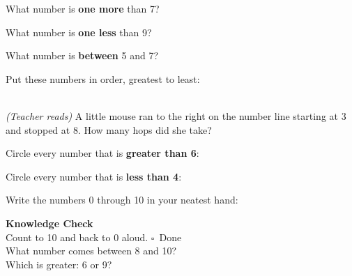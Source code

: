 \documentclass[12pt,letterpaper]{article}
\begin{document}
\vspace{12pt}
\prob What number is \textbf{one more} than 7? \quad\ansblank

\vspace{10pt}
\prob What number is \textbf{one less} than 9? \quad\ansblank

\vspace{10pt}
\prob What number is \textbf{between} 5 and 7? \quad\ansblank

\vspace{10pt}
\prob Put these numbers in order, greatest to least:\\[6pt]
\hspace{2cm}{\Large 4 \quad 9 \quad 2 \quad 7 \quad 6}\\[6pt]
\hspace{2cm}\ansblank\quad\ansblank\quad\ansblank\quad\ansblank\quad\ansblank

\vspace{10pt}
\prob \textit{(Teacher reads)} A little mouse ran to the right on the number line
starting at 3 and stopped at 8.
How many hops did she take? \quad\ansblank

\vspace{10pt}
\prob Circle every number that is \textbf{greater than 6}:\\[6pt]
\hspace{2cm}{\Large 0 \quad 5 \quad 7 \quad 10 \quad 3 \quad 9 \quad 6 \quad 8}

\vspace{10pt}
\prob Circle every number that is \textbf{less than 4}:\\[6pt]
\hspace{2cm}{\Large 5 \quad 1 \quad 3 \quad 8 \quad 0 \quad 4 \quad 2 \quad 7}

\vspace{10pt}
\prob Write the numbers 0 through 10 in your neatest hand:\\[8pt]
\noindent\fbox{\rule{0pt}{1.8cm}\hspace{12.5cm}}

\goldrule

\begin{checkbox}
\noindent\textbf{\color{sd-green}Knowledge Check}\\[4pt]
\setcounter{probnum}{0}
\prob Count to 10 and back to 0 aloud. \quad $\square$~Done\\[8pt]
\prob What number comes between 8 and 10? \quad\ansblank\\[8pt]
\prob Which is greater: 6 or 9? \quad\ansblank
\end{checkbox}
\end{document}
